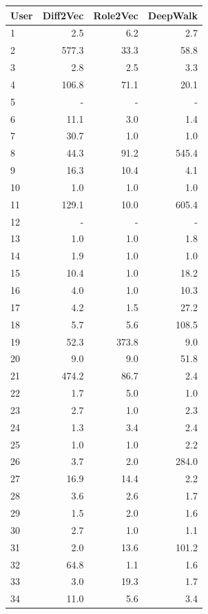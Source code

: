 \documentclass[12pt,a4paper,titlepage,oneside,english]{article}
\begin{document}
\begin{table}[h!]
\scriptsize
  \centering
  \begin{tabular}{lrrr}
    \hline
	\textbf{User} & \textbf{Diff2Vec} & \textbf{Role2Vec} & \textbf{DeepWalk} \\
	\hline
    1 & 2.5 & 6.2 & 2.7 \\
    2 & 577.3 & 33.3 & 58.8 \\
    3 & 2.8 & 2.5 & 3.3 \\
    4 & 106.8 & 71.1 & 20.1 \\
    5 & - & - & - \\
    6 & 11.1 & 3.0 & 1.4 \\
    7 & 30.7 & 1.0 & 1.0 \\
    8 & 44.3 & 91.2 & 545.4 \\
    9 & 16.3 & 10.4 & 4.1 \\
    10 & 1.0 & 1.0 & 1.0 \\
    11 & 129.1 & 10.0 & 605.4 \\
    12 & - & - & - \\
    13 & 1.0 & 1.0 & 1.8 \\
    14 & 1.9 & 1.0 & 1.0 \\
    15 & 10.4 & 1.0 & 18.2 \\
    16 & 4.0 & 1.0 & 10.3 \\
    17 & 4.2 & 1.5 & 27.2 \\
    18 & 5.7 & 5.6 & 108.5 \\
    19 & 52.3 & 373.8 & 9.0 \\
    20 & 9.0 & 9.0 & 51.8 \\
    21 & 474.2 & 86.7 & 2.4 \\
    22 & 1.7 & 5.0 & 1.0 \\
    23 & 2.7 & 1.0 & 2.3 \\
    24 & 1.3 & 3.4 & 2.4 \\
    25 & 1.0 & 1.0 & 2.2 \\
    26 & 3.7 & 2.0 & 284.0 \\
    27 & 16.9 & 14.4 & 2.2 \\
    28 & 3.6 & 2.6 & 1.7 \\
    29 & 1.5 & 2.0 & 1.6 \\
    30 & 2.7 & 1.0 & 1.1 \\
    31 & 2.0 & 13.6 & 101.2 \\
    32 & 64.8 & 1.1 & 1.6 \\
    33 & 3.0 & 19.3 & 1.7 \\
    34 & 11.0 & 5.6 & 3.4 \\

\end{tabular}
\end{table}
\end{document}
